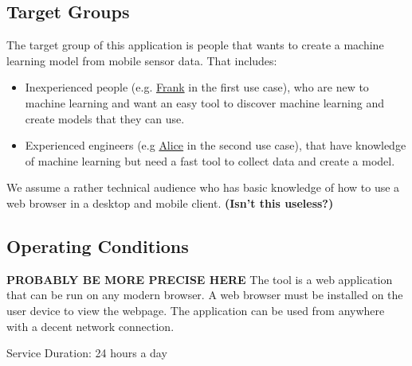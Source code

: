 \subsection{Target Groups}
The target group of this application is people that wants to create a machine learning model from mobile sensor data.
That includes:
\begin{itemize}
    \item Inexperienced people (e.g. \hyperref[ocfrank]{Frank} in the first use case), who are new to machine learning and want an easy tool to discover machine learning and create models that they can use.
    \item Experienced engineers (e.g \hyperref[ocalice]{Alice} in the second use case), that have knowledge of machine learning but need a fast tool to collect data and create a model.
\end{itemize}
We assume a rather technical audience who has basic knowledge of how to use a web browser in a desktop and mobile client. \textbf{(Isn't this useless?)}

\subsection{Operating Conditions}
\textbf{PROBABLY BE MORE PRECISE HERE}
The tool is a web application that can be run on any modern browser. A web browser must be installed on the user device to view the webpage. The application can be used from anywhere with a decent network connection.

Service Duration: 24 hours a day
